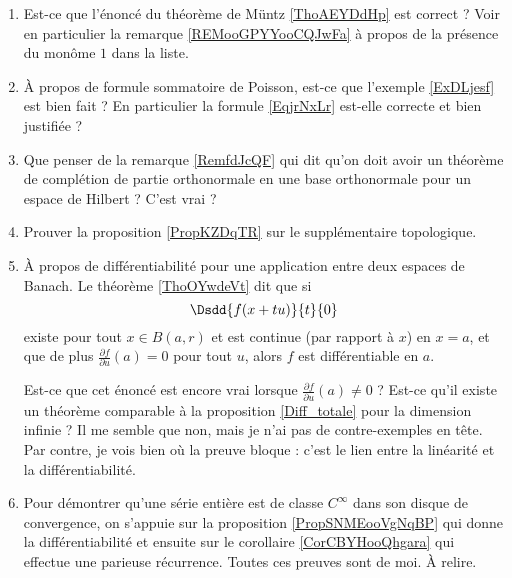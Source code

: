 \begin{enumerate}
    \item
        Est-ce que l'énoncé du théorème de Müntz \ref{ThoAEYDdHp} est correct ? Voir en particulier la remarque \ref{REMooGPYYooCQJwFa} à propos de la présence du monôme  \( 1\) dans la liste.
    \item
        À propos de formule sommatoire de Poisson, est-ce que l'exemple \ref{ExDLjesf} est bien fait ? En particulier la formule \eqref{EqjrNxLr} est-elle correcte et bien justifiée ?
    \item
        Que penser de la remarque \ref{RemfdJcQF} qui dit qu'on doit avoir un théorème de complétion de partie orthonormale en une base orthonormale pour un espace de Hilbert ? C'est vrai ?
    \item
        Prouver la proposition \ref{PropKZDqTR} sur le supplémentaire topologique.
    \item   \label{ItemLPrIWZhPg}
        À propos de différentiabilité pour une application entre deux espaces de Banach. Le théorème \ref{ThoOYwdeVt} dit que si
    \begin{equation}
        \Dsdd{ f(x+tu) }{t}{0}
    \end{equation}
    existe pour tout \( x\in B(a,r)\) et est continue (par rapport à \( x\)) en \( x=a\), et que de plus \( \frac{ \partial f }{ \partial u }(a)=0\) pour tout \( u\), alors \( f\) est différentiable en \( a\).

    Est-ce que cet énoncé est encore vrai lorsque \( \frac{ \partial f }{ \partial u }(a)\neq 0\) ? Est-ce qu'il existe un théorème comparable à la proposition \ref{Diff_totale} pour la dimension infinie ? Il me semble que non, mais je n'ai pas de contre-exemples en tête. Par contre, je vois bien où la preuve bloque : c'est le lien entre la linéarité et la différentiabilité.

    \item
        Pour démontrer qu'une série entière est de classe \(  C^{\infty}\) dans son disque de convergence, on s'appuie sur la proposition \ref{PropSNMEooVgNqBP} qui donne la différentiabilité et ensuite sur le corollaire \ref{CorCBYHooQhgara} qui effectue une parieuse récurrence. Toutes ces preuves sont de moi. À relire.

\end{enumerate}

